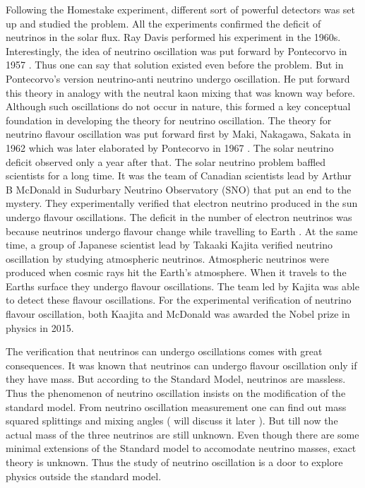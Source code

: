 \documentclass[12pt,a4paper]{report}
\begin{document}
Following the Homestake experiment, different sort of powerful detectors was set up and studied the problem. All the experiments confirmed the deficit of neutrinos in the solar flux. Ray Davis performed his experiment in the 1960s. Interestingly, the idea of neutrino oscillation was put forward by Pontecorvo in 1957 \cite{ponte57}. Thus one can say that solution existed even before the problem. But in Pontecorvo’s version neutrino-anti neutrino undergo oscillation. He put forward this theory in analogy with the neutral kaon mixing that was known way before. Although such oscillations do not occur in nature, this formed a key conceptual foundation in developing the theory for neutrino oscillation. The theory for neutrino flavour oscillation was put forward first by Maki, Nakagawa, Sakata in 1962 \cite{maki} which was later elaborated by Pontecorvo in 1967 \cite{ponte68}. The solar neutrino deficit observed only a year after that. The solar neutrino problem baffled scientists for a long time. It was the team of Canadian scientists lead by Arthur B McDonald in Sudurbary Neutrino Observatory (SNO) that put an end to the mystery. They experimentally verified that electron neutrino produced in the sun undergo flavour oscillations. The deficit in the number of electron neutrinos was because neutrinos undergo flavour change while travelling to Earth \cite{mcdonald}. At the same time, a group of Japanese scientist lead by Takaaki Kajita verified neutrino oscillation by studying atmospheric neutrinos. Atmospheric neutrinos were produced when cosmic rays hit the Earth’s atmosphere. When it travels to the Earths surface they undergo flavour oscillations. The team led by Kajita was able to detect these flavour oscillations. For the experimental verification of neutrino flavour oscillation, both Kaajita and McDonald was awarded the Nobel prize in physics in 2015.

The verification that neutrinos can undergo oscillations comes with great consequences. It was known that neutrinos can undergo flavour oscillation only if they have mass. But according to the Standard Model, neutrinos are massless. Thus the phenomenon of neutrino oscillation insists on the modification of the standard model. From neutrino oscillation measurement one can find out mass squared splittings and mixing angles ( will discuss it later ). But till now the actual mass of the three neutrinos are still unknown. Even though there are some minimal extensions of the Standard model to accomodate neutrino masses, exact theory is unknown. Thus the study of neutrino oscillation is a door to explore physics outside the standard model.
\newpage
\thispagestyle{empty}
\mbox{}
\newpage
\end{document}
